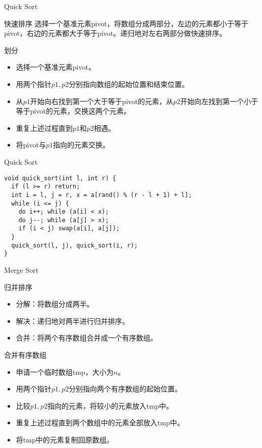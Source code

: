 \documentclass{ldr-simple-gray}
\begin{document}
  \begin{frame}{Quick Sort}
    \begin{block}{快速排序}
      选择一个基准元素pivot，将数组分成两部分，左边的元素都小于等于pivot，右边的元素都大于等于pivot。递归地对左右两部分做快速排序。
    \end{block}
    \begin{block}{划分}
      \begin{itemize}
        \item 选择一个基准元素pivot。
        \item 用两个指针$p1,p2$分别指向数组的起始位置和结束位置。
        \item 从$p1$开始向右找到第一个大于等于pivot的元素，从$p2$开始向左找到第一个小于等于pivot的元素，交换这两个元素。
        \item 重复上述过程直到$p1$和$p2$相遇。
        \item 将pivot与$p1$指向的元素交换。
      \end{itemize}
    \end{block}
  \end{frame}

  \begin{frame}[fragile]{Quick Sort}
    \begin{verbatim}
void quick_sort(int l, int r) {
  if (l >= r) return;
  int i = l, j = r, x = a[rand() % (r - l + 1) + l];
  while (i <= j) {
    do i++; while (a[i] < x);
    do j--; while (a[j] > x);
    if (i < j) swap(a[i], a[j]);
  }
  quick_sort(l, j), quick_sort(i, r);
}
    \end{verbatim}
  \end{frame}

  \begin{frame}{Merge Sort}
    \begin{block}{归并排序}
      \begin{itemize}
        \item 分解：将数组分成两半。
        \item 解决：递归地对两半进行归并排序。
        \item 合并：将两个有序数组合并成一个有序数组。
      \end{itemize}
    \end{block}

    \begin{block}{合并有序数组}
      \begin{itemize}
        \item 申请一个临时数组tmp，大小为$n$。
        \item 用两个指针$p1,p2$分别指向两个有序数组的起始位置。
        \item 比较$p1,p2$指向的元素，将较小的元素放入tmp中。
        \item 重复上述过程直到两个数组中的元素全部放入tmp中。
        \item 将tmp中的元素复制回原数组。
      \end{itemize}
    \end{block}
  \end{frame}
\end{document}
